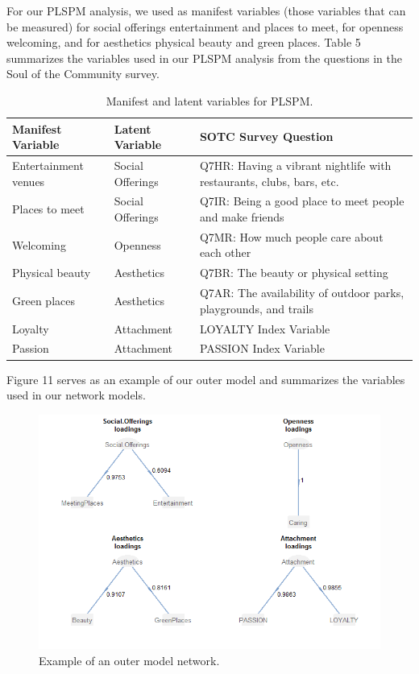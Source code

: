 \documentclass[11pt]{asaproc}
\begin{document}
For our PLSPM analysis, we used as manifest variables (those variables
that can be measured) for social
offerings entertainment and places to meet, for openness welcoming,
and for aesthetics physical beauty and green places. Table
5 summarizes the variables used in our PLSPM
analysis from the questions in the Soul of the Community survey. 

\begin{table}[H]
\begin{center}
\begin{tabular}{P{3.cm}|P{3.cm}|P{5.5cm}}
\hline
\hline
Manifest Variable & Latent Variable & SOTC Survey Question \\
\hline
Entertainment venues & Social Offerings & Q7HR: Having a vibrant
nightlife with restaurants, clubs, bars, etc. \\
Places to meet & Social Offerings & Q7IR: Being a good place to meet
people and make friends \\
Welcoming & Openness & Q7MR: How much people care about each other \\
Physical beauty & Aesthetics & Q7BR: The beauty or physical setting \\
Green places & Aesthetics & Q7AR: The availability of outdoor parks,
playgrounds, and trails \\
Loyalty & Attachment & LOYALTY Index Variable \\
Passion & Attachment & PASSION Index Variable \\
\hline
\hline
\end{tabular}
\caption{Manifest and latent variables for PLSPM.}
\label{table:ManifestLatent}
\end{center}
\end{table}

\pagebreak

Figure 11 serves as an example of our outer model and
summarizes the variables used in our network models. 

\begin{figure}[H]
\begin{center}
\includegraphics[width=\textwidth]{OuterModel.png}
\caption{Example of an outer model network.}
\label{fig:OuterModel}
\end{center}
\end{figure}
\end{document}

